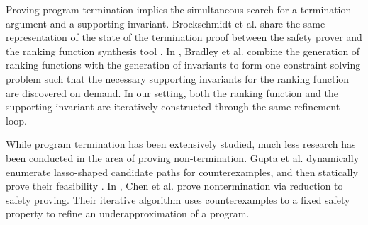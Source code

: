 \documentclass[preprint]{sigplanconf}
\theoremstyle{definition}
\begin{document}
Proving program termination implies the simultaneous search for a
termination argument and a supporting invariant.  
Brockschmidt et al. 
share the same representation of the state of the termination proof
between the safety prover and the ranking function synthesis tool \cite{DBLP:conf/cav/BrockschmidtCF13}.  
In \cite{DBLP:conf/cav/BradleyMS05},
Bradley et al.  combine the generation of ranking functions with the
generation of invariants to form one constraint solving problem such that
the necessary supporting invariants for the ranking function are discovered
on demand.  In our setting, both the ranking function and the supporting
invariant are iteratively constructed through the same refinement loop.

While program termination has been extensively studied, much less research has been conducted 
in the area of proving non-termination. Gupta et al. dynamically enumerate lasso-shaped candidate
paths for counterexamples, and then statically prove their feasibility \cite{DBLP:conf/popl/GuptaHMRX08}. 
In \cite{DBLP:conf/tacas/ChenCFNO14}, Chen et al. prove nontermination via
reduction to safety proving. Their iterative algorithm uses counterexamples to a fixed safety property
to refine an underapproximation of a program. 
 


{}
\end{document}

